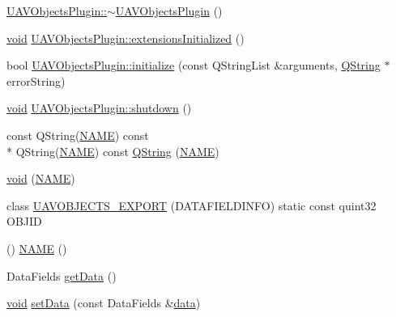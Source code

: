 \begin{DoxyCompactItemize}
\item 
\hyperlink{group___u_a_v_objects_plugin_ga34b24d065eef797812c717bde15e7252}{U\-A\-V\-Objects\-Plugin\-::$\sim$\-U\-A\-V\-Objects\-Plugin} ()
\item 
\hyperlink{group___u_a_v_objects_plugin_ga444cf2ff3f0ecbe028adce838d373f5c}{void} \hyperlink{group___u_a_v_objects_plugin_ga01c0cfcad9946436827836ba293f07b0}{U\-A\-V\-Objects\-Plugin\-::extensions\-Initialized} ()
\item 
bool \hyperlink{group___u_a_v_objects_plugin_ga782e9362e4a727e032c97865d0841820}{U\-A\-V\-Objects\-Plugin\-::initialize} (const Q\-String\-List \&arguments, \hyperlink{group___u_a_v_objects_plugin_gab9d252f49c333c94a72f97ce3105a32d}{Q\-String} $\ast$error\-String)
\item 
\hyperlink{group___u_a_v_objects_plugin_ga444cf2ff3f0ecbe028adce838d373f5c}{void} \hyperlink{group___u_a_v_objects_plugin_gab62f36eaf3f542f980ef1d88c29bd05a}{U\-A\-V\-Objects\-Plugin\-::shutdown} ()
\item 
const Q\-String(\hyperlink{group___u_a_v_objects_plugin_gacbd8a57cc2bde1166c3cdc997e749579}{N\-A\-M\-E}) const \\*
Q\-String(\hyperlink{group___u_a_v_objects_plugin_gacbd8a57cc2bde1166c3cdc997e749579}{N\-A\-M\-E}) const \hyperlink{group___u_a_v_objects_plugin_gab9d252f49c333c94a72f97ce3105a32d}{Q\-String} (\hyperlink{group___u_a_v_objects_plugin_gacbd8a57cc2bde1166c3cdc997e749579}{N\-A\-M\-E})
\item 
\hyperlink{group___u_a_v_objects_plugin_ga444cf2ff3f0ecbe028adce838d373f5c}{void} (\hyperlink{group___u_a_v_objects_plugin_gacbd8a57cc2bde1166c3cdc997e749579}{N\-A\-M\-E})
\item 
class \hyperlink{group___u_a_v_objects_plugin_ga53c21e9d7a97da3f92a8173de85ba07f}{U\-A\-V\-O\-B\-J\-E\-C\-T\-S\-\_\-\-E\-X\-P\-O\-R\-T} (D\-A\-T\-A\-F\-I\-E\-L\-D\-I\-N\-F\-O) static const quint32 O\-B\-J\-I\-D
\item 
() \hyperlink{group___u_a_v_objects_plugin_gacbd8a57cc2bde1166c3cdc997e749579}{N\-A\-M\-E} ()
\item 
Data\-Fields \hyperlink{group___u_a_v_objects_plugin_ga54464b81a93ee378fa968d757d41e224}{get\-Data} ()
\item 
\hyperlink{group___u_a_v_objects_plugin_ga444cf2ff3f0ecbe028adce838d373f5c}{void} \hyperlink{group___u_a_v_objects_plugin_ga7bfb4a458bedf2838118bc3069a93f1e}{set\-Data} (const Data\-Fields \&\hyperlink{glext_8h_a8850df0785e6fbcc2351af3b686b8c7a}{data})
\item 

\end{DoxyCompactItemize}
